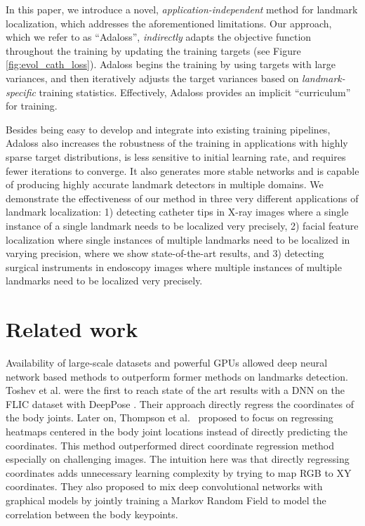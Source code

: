 \documentclass[10pt,twocolumn,letterpaper]{article}
\begin{document}
In this paper, we introduce a novel, \textit{application-independent} method for landmark localization, which addresses the aforementioned limitations. Our approach, which we refer to as ``Adaloss'', \textit{indirectly} adapts the objective function throughout the training by updating the training targets (see Figure \ref{fig:evol_cath_loss}). Adaloss begins the training by using targets with large variances, and then iteratively adjusts the target variances based on \textit{landmark-specific} training statistics. Effectively, Adaloss provides an implicit ``curriculum'' for training.

Besides being easy to develop and integrate into existing training pipelines, Adaloss also increases the robustness of the training in applications with highly sparse target distributions, is less sensitive to initial learning rate, and requires fewer iterations to converge. It also generates more stable networks \cite{deformstab} and is capable of producing highly accurate landmark detectors in multiple domains. We demonstrate the effectiveness of our method in three very different applications of landmark localization: 1) detecting catheter tips in X-ray images where a single instance of a single landmark needs to be localized very precisely, 2) facial feature localization where single instances of multiple landmarks need to be localized in varying precision, where we show state-of-the-art results, and 3) detecting surgical instruments in endoscopy images where multiple instances of multiple landmarks need to be localized very precisely.



 

\section{Related work}

Availability of large-scale datasets \cite{flic, mpii} and powerful
GPUs allowed deep neural network based methods to outperform former methods on
landmarks detection. Toshev et al. were the first to reach
state of the art results with a DNN on the FLIC
dataset \cite{flic} with DeepPose \cite{deeppose}. Their approach
directly regress the coordinates of the body joints. Later
on, Thompson et al.~\cite{thompson} proposed to focus on regressing
heatmaps centered in the body joint locations instead of directly
predicting the coordinates.  This method outperformed direct
coordinate regression method especially on challenging images. The
intuition here was that directly regressing coordinates adds
unnecessary learning complexity by trying to map RGB to XY coordinates.
They also proposed to mix deep convolutional networks with
graphical models by jointly training a Markov Random Field to model the
correlation between the body keypoints.
\end{document}
